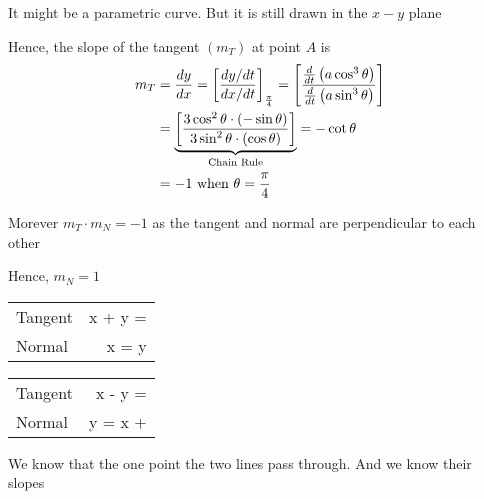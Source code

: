 \documentclass[14pt,fleqn]{extarticle}
\newcommand\cx{a\sin^3\theta}
\newcommand\cy{a\cos^3\theta}
\begin{document}
\begin{question}
\begin{step}
     \reason 
    
    It might be a parametric curve. But it is still drawn in the $x-y$ plane \newline 
    
    Hence, the slope of the tangent $(m_T)$ at point $A$ is
    \begin{align}
	m_T &= \dydx = \left[ \frac{dy / dt}{dx / dt}\right]_{\frac\pi{4}} 
	= \left[\frac{\frac{d}{dt} \left(\cy \right)}{\frac{d}{dt} \left(\cx \right)} \right]\\
	&= \underbrace{\left[\frac{3\cos^2\theta\cdot (-\sin\theta)}{3\sin^2\theta\cdot (\cos\theta)} \right]}_{\text{Chain Rule}} = -\cot\theta \\
	&= -1\text{ when } \theta = \frac\pi{4}
\end{align}

Morever $m_T\cdot m_N = -1$ as the tangent and normal are perpendicular to each other \newline 

Hence, $m_N = 1$ 
\end{step}

\begin{step}
  \begin{options} 
     \correct 
       
     \begin{center}
  \begin{tabular}{lN}
   \toprule
        &   \\
   \midrule 
   Tangent & x + y = \\
    \midrule 
    Normal & x = y \\ 
    \bottomrule
  \end{tabular}
\end{center}
     \incorrect
        
        \begin{center}
  \begin{tabular}{lN}
   \toprule
        &   \\
   \midrule 
   Tangent & x - y = \\
    \midrule 
    Normal & y = x +  \\ 
    \bottomrule
  \end{tabular}
\end{center}

    \end{options} 
     \reason 
     
     We know that the one point the two lines pass through. And we know their slopes\newline 
     

\end{step}
\end{question}
\end{document}
